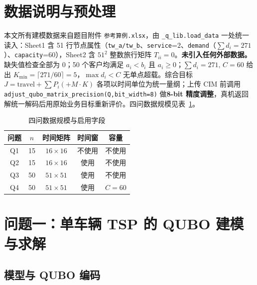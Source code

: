 \documentclass[UTF8,12pt,a4paper]{ctexart}
\begin{document}
\section{数据说明与预处理}

本文所有建模数据来自题目附件\cite{problem2026} \texttt{参考算例.xlsx}，由 \texttt{\_q\_lib.load\_data} 一处统一读入：Sheet1 含 51 行节点属性（\texttt{tw\_a/tw\_b}、\texttt{service}=$2$、\texttt{demand}（$\sum d_i\!=\!271$）、\texttt{capacity}=$60$），Sheet2 含 $51^{2}$ 整数旅行矩阵 $T_{ii}=0$。\textbf{未引入任何外部数据。}缺失值检查全部为 0；50 个客户均满足 $a_i<b_i$ 且 $a_i\ge 0$；$\sum d_i\!=\!271,\,C\!=\!60$ 给出 $K_{\min}\!=\!\lceil 271/60\rceil\!=\!5$，$\max d_i<C$ 无单点超载。综合目标 $J\!=\!\text{travel}\!+\!\sum P_i(+M\!\cdot\!K)$ 各项以时间单位为统一量纲；上传 CIM 前调用 \texttt{adjust\_qubo\_matrix\_precision(Q,bit\_width=8)} 做\textbf{8-bit 精度调整}，真机返回解统一解码后用原始业务目标重新评价。四问数据规模见表~\ref{tab:scale}。

\begin{table}[H]
    \centering\footnotesize
    \caption{四问数据规模与启用字段}
    \label{tab:scale}
    \begin{tabular}{c c c c c}
        \toprule
        问题 & $n$ & 时间矩阵 & 时间窗 & 容量 \\
        \midrule
        Q1 & 15 & $16\!\times\!16$ & 不使用 & 不使用 \\
        Q2 & 15 & $16\!\times\!16$ & 使用 & 不使用 \\
        Q3 & 50 & $51\!\times\!51$ & 使用 & 不使用 \\
        Q4 & 50 & $51\!\times\!51$ & 使用 & $C=60$ \\
        \bottomrule
    \end{tabular}
\end{table}

\section{问题一：单车辆 TSP 的 QUBO 建模与求解}
\label{sec:q1}

\subsection{模型与 QUBO 编码}
\label{subsec:q1-qubo}
\end{document}

